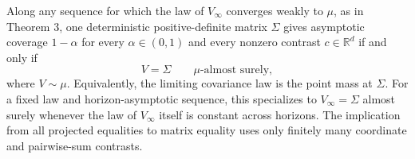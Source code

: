 Along any sequence for which the law of \(V_\infty\) converges weakly to \(\mu\), as in Theorem 3, one deterministic positive-definite matrix \(\Sigma\) gives asymptotic coverage \(1-\alpha\) for every \(\alpha\in(0,1)\) and every nonzero contrast \(c\in\mathbb R^d\) if and only if
\[
 V=\Sigma\qquad\mu\text{-almost surely},
\]
where \(V\sim\mu\). Equivalently, the limiting covariance law is the point mass at \(\Sigma\). For a fixed law and horizon-asymptotic sequence, this specializes to \(V_\infty=\Sigma\) almost surely whenever the law of \(V_\infty\) itself is constant across horizons. The implication from all projected equalities to matrix equality uses only finitely many coordinate and pairwise-sum contrasts.